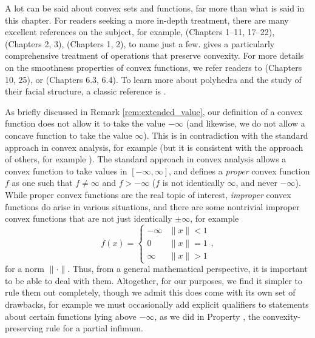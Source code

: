 A lot can be said about convex sets and functions, far more than what is said in
this chapter. For readers seeking a more in-depth treatment, there are many
excellent references on the subject, for example, 
\cite{rockafellar1970convex} (Chapters 1--11, 17--22), \cite{boyd2004convex}  
(Chapters 2, 3), \cite{bertsekas2009convex} (Chapters 1, 2), to name just a
few. \cite{boyd2004convex} gives a particularly comprehensive treatment of  
operations that preserve convexity. For more details on the smoothness
properties of convex functions, we refer readers to \cite{rockafellar1970convex}
(Chapters 10, 25), or \cite{evans2015measure} (Chapters 6.3, 6.4). To learn
more about polyhedra and the study of their facial structure, a classic
reference is \cite{grunbaum2003convex}.      

As briefly discussed in Remark \ref{rem:extended_value}, our definition of a
convex function does not allow it to take the value $-\infty$ (and likewise, we
do not allow a concave function to take the value $\infty$). This is in
contradiction with the standard approach in convex analysis, for example
\cite{rockafellar1970convex, bertsekas2009convex} (but it is consistent with 
the approach of others, for example \cite{boyd2004convex}). The standard
approach in convex analysis allows a convex function to take values in
$[-\infty,\infty]$, and defines a \emph{proper} convex function $f$ as one
such that $f \not= \infty$ and $f > -\infty$ ($f$ is not identically $\infty$,
and never $-\infty$). While proper convex functions are the real topic of
interest, \emph{improper} convex functions do arise in various situations, and
there are some nontrivial improper convex functions that are not just
identically $\pm \infty$, for example
\[
f(x) = \begin{cases}
-\infty & \|x\| < 1 \\
0 & \|x\| = 1 \\
\infty & \|x\| > 1
\end{cases},
\]
for a norm $\|\cdot\|$. Thus, from a general mathematical perspective, it is
important to be able to deal with them. Altogether, for our purposes, we find it
simpler to rule them out completely, though we admit this does come with its own
set of drawbacks, for example we must occasionally add explicit qualifiers to
statements about certain functions lying above $-\infty$, as we did in Property 
, the convexity-preserving rule for a partial
infimum.

\clearpage


